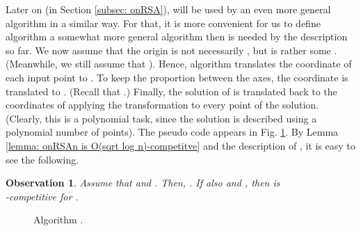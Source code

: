 \documentclass[11pt]{article}
\newtheorem{observation}[theorem]{Observation}
\begin{document}
Later on (in Section \ref{subsec: onRSA}),  will be used by an even more general algorithm in a similar way. For that, it is more convenient for us to define algorithm  a somewhat more general algorithm then is needed by the description so far.
We now assume that the origin is not necessarily , but is rather some .
(Meanwhile, we still assume that ).
 Hence, algorithm  translates the  coordinate of each input point  to .
To keep the proportion between the axes, the  coordinate  is translated to
. (Recall that .)
Finally, the solution of  is translated back to the coordinates of  applying the transformation  to every point of the solution.
(Clearly, this is a polynomial task, since the solution is described using a polynomial number of points).
The pseudo code appears in Fig. \ref{fig:middle-alg}.
By Lemma \ref{lemma: onRSAn is O(sqrt log n)-competitve} and the description of , it is easy to see the following.

\begin{observation}
Assume that  and .
Then, .
If also  and , then  is
\commdouble\\\commdoubleend
-competitive for
.
\label{corollary: onRSAmn is O(sqrt)-cometitve}
\end{observation}





\def\FigCodeOnRSAmn{
\begin{figure}[ht!]
\fboxsep=0.2cm
\caption{\label{fig:middle-alg}
Algorithm .
}
\end{figure}

} \FigCodeOnRSAmn
\end{document}
